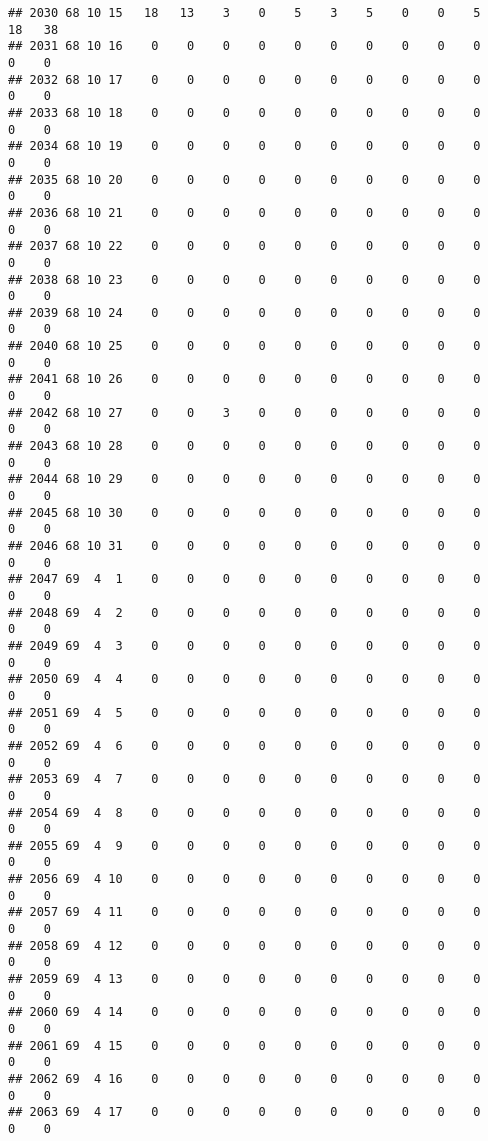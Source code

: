 \documentclass[]{article}
\begin{document}
\begin{verbatim}
## 2030 68 10 15   18   13    3    0    5    3    5    0    0    5   18   38
## 2031 68 10 16    0    0    0    0    0    0    0    0    0    0    0    0
## 2032 68 10 17    0    0    0    0    0    0    0    0    0    0    0    0
## 2033 68 10 18    0    0    0    0    0    0    0    0    0    0    0    0
## 2034 68 10 19    0    0    0    0    0    0    0    0    0    0    0    0
## 2035 68 10 20    0    0    0    0    0    0    0    0    0    0    0    0
## 2036 68 10 21    0    0    0    0    0    0    0    0    0    0    0    0
## 2037 68 10 22    0    0    0    0    0    0    0    0    0    0    0    0
## 2038 68 10 23    0    0    0    0    0    0    0    0    0    0    0    0
## 2039 68 10 24    0    0    0    0    0    0    0    0    0    0    0    0
## 2040 68 10 25    0    0    0    0    0    0    0    0    0    0    0    0
## 2041 68 10 26    0    0    0    0    0    0    0    0    0    0    0    0
## 2042 68 10 27    0    0    3    0    0    0    0    0    0    0    0    0
## 2043 68 10 28    0    0    0    0    0    0    0    0    0    0    0    0
## 2044 68 10 29    0    0    0    0    0    0    0    0    0    0    0    0
## 2045 68 10 30    0    0    0    0    0    0    0    0    0    0    0    0
## 2046 68 10 31    0    0    0    0    0    0    0    0    0    0    0    0
## 2047 69  4  1    0    0    0    0    0    0    0    0    0    0    0    0
## 2048 69  4  2    0    0    0    0    0    0    0    0    0    0    0    0
## 2049 69  4  3    0    0    0    0    0    0    0    0    0    0    0    0
## 2050 69  4  4    0    0    0    0    0    0    0    0    0    0    0    0
## 2051 69  4  5    0    0    0    0    0    0    0    0    0    0    0    0
## 2052 69  4  6    0    0    0    0    0    0    0    0    0    0    0    0
## 2053 69  4  7    0    0    0    0    0    0    0    0    0    0    0    0
## 2054 69  4  8    0    0    0    0    0    0    0    0    0    0    0    0
## 2055 69  4  9    0    0    0    0    0    0    0    0    0    0    0    0
## 2056 69  4 10    0    0    0    0    0    0    0    0    0    0    0    0
## 2057 69  4 11    0    0    0    0    0    0    0    0    0    0    0    0
## 2058 69  4 12    0    0    0    0    0    0    0    0    0    0    0    0
## 2059 69  4 13    0    0    0    0    0    0    0    0    0    0    0    0
## 2060 69  4 14    0    0    0    0    0    0    0    0    0    0    0    0
## 2061 69  4 15    0    0    0    0    0    0    0    0    0    0    0    0
## 2062 69  4 16    0    0    0    0    0    0    0    0    0    0    0    0
## 2063 69  4 17    0    0    0    0    0    0    0    0    0    0    0    0

\end{verbatim}
\end{document}
